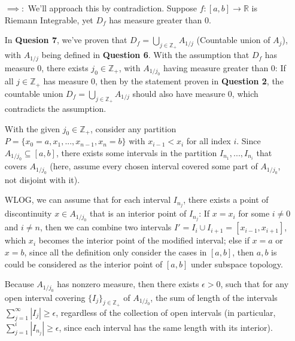 \documentclass{article}
\begin{document}
\begin{itemize}
    \item[$\implies:$] We'll approach this by contradiction. Suppose $f:[a,b]\rightarrow \mathbb{R}$ is Riemann Integrable, yet $D_f$ has measure greater than $0$.
    
    In \textbf{Quesion 7}, we've proven that $D_f = \bigcup_{j\in\mathbb{Z}_+}A_{1/j}$ (Countable union of $A_j$), with $A_{1/j}$ being defined in \textbf{Question 6}.
    With the assumption that $D_f$ has measure $0$, there exists $j_0\in\mathbb{Z}_+$, with $A_{1/j_0}$ having measure greater than $0$: If all $j\in\mathbb{Z}_+$ has measure $0$,
    then by the statement proven in \textbf{Question 2}, the countable union $D_f=\bigcup_{j\in\mathbb{Z}_+}A_{1/j}$ should also have measure $0$, which contradicts the assumption.

    \hfill

    With the given $j_0\in\mathbb{Z}_+$, consider any partition $P=\{x_0=a,x_1,...,x_{n-1},x_n=b\}$ with $x_{i-1}<x_i$ for all index $i$.
    Since $A_{1/j_0}\subseteq [a,b]$, there exists some intervals in the partition $I_{n_1},...,I_{n_i}$ that covers $A_{1/j_0}$ (here, assume every chosen interval covered some part of $A_{1/j_0}$, not disjoint with it).

    WLOG, we can assume that for each interval $I_{n_j}$, there exists a point of discontinuity $x\in A_{1/j_0}$ that is an interior point of $I_{n_j}$:
    If $x=x_i$ for some $i\neq 0$ and $i\neq n$, then we can combine two intervals $I'=I_{i}\cup I_{i+1}=[x_{i-1},x_{i+1}]$, which $x_i$ becomes the interior point of the modified interval;
    else if $x=a$ or $x=b$, since all the definition only consider the cases in $[a,b]$, then $a,b$ is could be considered as the interior point of $[a,b]$ under subspace topology.

    \hfill
    
    Because $A_{1/j_0}$ has nonzero measure, then there exists $\epsilon>0$, such that for any open interval covering $\{I_j\}_{j\in\mathbb{Z}_+}$ of $A_{1/j_0}$, the sum of length of the intervals $\sum_{j=1}^{\infty}|I_{j}|\geq \epsilon$, regardless of the collection of open intervals
    (in particular, $\sum_{j=1}^{i}|I_{n_j}|\geq \epsilon$, since each interval has the same length with its interior).
    

\end{itemize}
\end{document}
